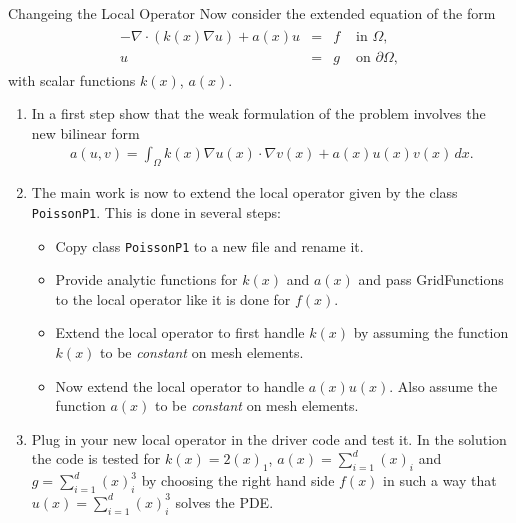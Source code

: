\documentclass[12pt,a4paper]{article}
\begin{document}
\begin{Exercise}{Changeing the Local Operator}
Now consider the extended equation of the form
\begin{align}
    \begin{array}{rcll}
      -\nabla\cdot (k(x) \nabla u) +a(x) u  & = & f & \text{ in } \Omega, \\
      u & = & g & \text{ on } \partial\Omega,
    \end{array}
\end{align}
with scalar functions $k(x)$, $a(x)$.

\begin{enumerate}
\item In a first step show that the weak formulation of the problem
  involves the new bilinear form
  \begin{align}
    a(u,v) = \int_\Omega k(x) \nabla u(x) \cdot \nabla v(x) + a(x) u(x) v(x) \,dx .
  \end{align}
\item The main work is now to extend the local operator given by the
  class \lstinline{PoissonP1}. This is done in several steps:
  \begin{itemize}
  \item Copy class \lstinline{PoissonP1} to a new file and rename it.
  \item Provide analytic functions for $k(x)$ and $a(x)$ and pass
    GridFunctions to the local operator like it is done for $f(x)$.
  \item Extend the local operator to first handle $k(x)$ by assuming the
    function $k(x)$ to be \emph{constant} on mesh elements.
  \item Now extend the local operator to handle $a(x) u(x)$. Also assume
    the function $a(x)$ to be \emph{constant} on mesh elements.
  \end{itemize}
\item Plug in your new local operator in the driver code and test it.
  In the solution the code is tested for $k(x)=2(x)_1$,
  $a(x)=\sum_{i=1}^{d}(x)_i$ and $g=\sum_{i=1}^d (x)_i^3$ by choosing
  the right hand side $f(x)$ in such a way that $u(x)=\sum_{i=1}^d
  (x)_i^3$ solves the PDE.
\end{enumerate}
\end{Exercise}
\end{document}
